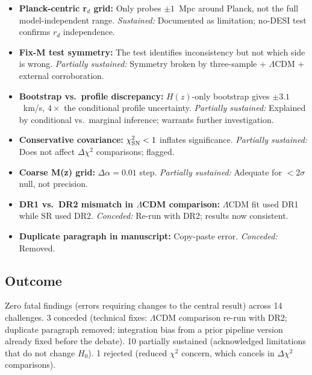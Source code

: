 \documentclass[twocolumn]{aastex631}
\begin{document}
\begin{itemize}
  \item \textbf{Planck-centric r$_d$ grid:} Only probes $\pm1$~Mpc
        around Planck, not the full model-independent range.
        \emph{Sustained:} Documented as limitation; no-DESI test
        confirms $r_d$ independence.
  \item \textbf{Fix-M test symmetry:} The test identifies inconsistency
        but not which side is wrong.
        \emph{Partially sustained:} Symmetry broken by three-sample
        + $\Lambda$CDM + external corroboration.
  \item \textbf{Bootstrap vs.\ profile discrepancy:} $H(z)$-only
        bootstrap gives $\pm3.1$~km/s, $4\times$ the conditional profile
        uncertainty.
        \emph{Partially sustained:} Explained by conditional vs.\
        marginal inference; warrants further investigation.
  \item \textbf{Conservative covariance:} $\chi^2_{\rm SN}<1$ inflates
        significance.
        \emph{Partially sustained:} Does not affect $\Delta\chi^2$
        comparisons; flagged.
  \item \textbf{Coarse M(z) grid:} $\Delta\alpha=0.01$ step.
        \emph{Partially sustained:} Adequate for $<2\sigma$ null,
        not precision.
  \item \textbf{DR1 vs.\ DR2 mismatch in $\Lambda$CDM comparison:}
        $\Lambda$CDM fit used DR1 while SR used DR2.
        \emph{Conceded:} Re-run with DR2; results now consistent.
  \item \textbf{Duplicate paragraph in manuscript:} Copy-paste error.
        \emph{Conceded:} Removed.
\end{itemize}

\subsection{Outcome}

Zero fatal findings (errors requiring changes to the central result)
across 14 challenges.
3 conceded (technical fixes: $\Lambda$CDM comparison re-run with DR2;
duplicate paragraph removed; integration bias from a prior pipeline
version already fixed before the debate).
10 partially sustained (acknowledged limitations that do not change
$H_0$).
1 rejected (reduced $\chi^2$ concern, which cancels in $\Delta\chi^2$
comparisons).
\end{document}
